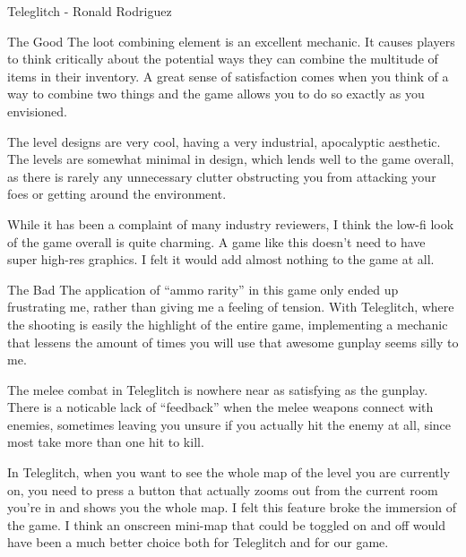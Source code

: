 \documentclass[12pt]{report}
\begin{document}
\begin{section}{Teleglitch - Ronald Rodriguez}
\begin{subsection}{The Good}
The loot combining element is an excellent mechanic. It causes players to
think critically about the potential ways they can combine the multitude of
items in their inventory. A great sense of satisfaction comes when you
think of a way to combine two things and the game allows you to do so
exactly as you envisioned. 

The level designs are very cool, having a very industrial, apocalyptic
aesthetic. The levels are somewhat minimal in design, which lends well to
the game overall, as there is rarely any unnecessary clutter obstructing
you from attacking your foes or getting around the environment. 

While it has been a complaint of many industry reviewers, I think the
low-fi look of the game overall is quite charming. A game like this doesn't
need to have super high-res graphics. I felt it would add almost nothing to
the game at all. 
\end{subsection}

\begin{subsection}{The Bad}
The application of ``ammo rarity'' in this game only ended up frustrating
me, rather than giving me a feeling of tension. With Teleglitch, where the
shooting is easily the highlight of the entire game, implementing a
mechanic that lessens the amount of times you will use that awesome gunplay
seems silly to me. 

The melee combat in Teleglitch is nowhere near as satisfying as the
gunplay. There is a noticable lack of ``feedback'' when the melee weapons
connect with enemies, sometimes leaving you unsure if you actually hit the
enemy at all, since most take more than one hit to kill.  

In Teleglitch, when you want to see the whole map of the level you are
currently on, you need to press a button that actually zooms out from the
current room you're in and shows you the whole map. I felt this feature
broke the immersion of the game. I think an onscreen mini-map that 
could be toggled on and off would have been a much better choice both for
Teleglitch and for our game.
\end{subsection}

\end{section}
\end{document}
